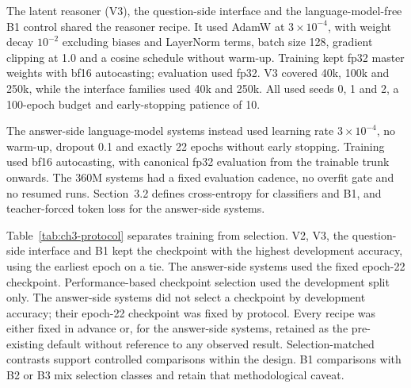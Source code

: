 The latent reasoner (V3), the question-side interface and the language-model-free
B1 control shared the reasoner recipe. It used AdamW at $3\times10^{-4}$, with weight decay
$10^{-2}$ excluding biases and LayerNorm terms, batch size 128, gradient
clipping at 1.0 and a cosine schedule without warm-up. Training kept fp32
master weights with bf16 autocasting; evaluation used fp32. V3 covered 40k,
100k and 250k, while the interface families used 40k and 250k. All used seeds
0, 1 and 2, a 100-epoch budget and early-stopping patience of 10.

The answer-side language-model systems instead used learning rate
$3\times10^{-4}$, no warm-up, dropout 0.1 and exactly 22 epochs without
early stopping. Training used bf16 autocasting, with canonical fp32 evaluation
from the trainable trunk onwards. The 360M systems had a fixed evaluation
cadence, no overfit gate and no resumed runs. Section~3.2 defines
cross-entropy for classifiers and B1, and teacher-forced token loss for the
answer-side systems.

Table~\ref{tab:ch3-protocol} separates training from selection. V2, V3, the
question-side interface and B1 kept the checkpoint with the highest
development accuracy, using the earliest epoch on a tie. The answer-side
systems used the fixed epoch-22 checkpoint. Performance-based checkpoint
selection used the development split only. The answer-side systems did not
select a checkpoint by development accuracy; their epoch-22 checkpoint was
fixed by protocol. Every recipe was either fixed in advance or, for the
answer-side systems, retained as the pre-existing default without reference to
any observed result. Selection-matched contrasts support controlled comparisons
within the design.
B1 comparisons with B2 or B3 mix selection classes and retain that
methodological caveat.

\begin{table}[p]
\centering
\caption[Training and checkpoint-selection protocols.]{Protocol constants by architecture family. Learning rate, warm-up and dropout are stated in the text. Best-on-development and fixed-epoch selection are separate classes; the compact-VLM row is evaluation only.}
\label{tab:ch3-protocol}
\begingroup
\scriptsize
\setlength{\tabcolsep}{1.5pt}
\renewenvironment{longtable}[1]
  {\begin{tabular}{|p{0.14\textwidth}|p{0.17\textwidth}|p{0.08\textwidth}|p{0.13\textwidth}|p{0.08\textwidth}|p{0.13\textwidth}|p{0.16\textwidth}|}}
  {\end{tabular}}
\let\endhead\relax
\renewcommand{\_}{\textunderscore\allowbreak}

\endgroup
\end{table}

